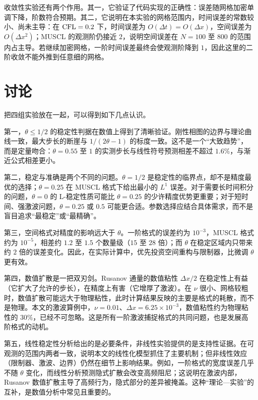 收敛性实验还有两个作用。其一，它验证了代码实现的正确性：误差随网格加密单调下降，阶数符合预期。其二，它说明在本实验的网格范围内，时间误差的常数较小、尚未主导：在 $\mathrm{CFL}=0.2$ 下，时间误差为 $O(\Delta t)=O(\Delta x)$，空间误差为 $O(\Delta x^2)$；MUSCL 的观测阶仍接近 $2$，说明空间误差在 $N=100$ 至 $800$ 的范围内占主导。若继续加密网格，一阶时间误差最终会使观测阶降到 $1$，因此这里的二阶收敛不能外推到任意细的网格。

\section{讨论}
\label{sec:exp-discussion}

把四组实验放在一起，可以得到如下几点认识。

第一，$\theta\le1/2$ 的稳定性判据在数值上得到了清晰验证。刚性相图的边界与理论曲线一致，最大步长的断崖与 $1/(2\theta-1)$ 的标度一致。这不是一个“大致趋势”，而是定量吻合：$\theta=0.55$ 至 $1$ 的实测步长与线性符号预测相差不超过 $1.6\%$，与渐近公式相差更小。

第二，稳定与准确是两个不同的问题。$\theta=1/2$ 是稳定性的临界点，却不是精度最优的选择；$\theta=0.25$ 在 MUSCL 格式下给出最小的 $L^1$ 误差。对于需要长时间积分的问题，$\theta=0$ 的 L-稳定性质可能比 $\theta=0.25$ 的少许精度优势更重要；对于短时间、强激波问题，$\theta=0.25$ 或 $0.5$ 可能更合适。参数选择应结合具体需求，而不是盲目追求“最稳定”或“最精确”。

第三，空间格式对精度的影响远大于 $\theta$。一阶格式的误差约为 $10^{-3}$，MUSCL 格式约为 $10^{-5}$，相差约 $1.2$ 至 $1.5$ 个数量级（$15$ 至 $28$ 倍）；而 $\theta$ 在稳定区域内只带来约 $2$ 倍的误差变化。因此，在实际计算中，优先投资空间重构与限制器，比微调 $\theta$ 更有效。

第四，数值扩散是一把双刃剑。Rusanov 通量的数值粘性 $\Delta x/2$ 在稳定性上有益（它扩大了允许的步长），在精度上有害（它增厚了激波）。在 $\nu$ 很小、网格较粗时，数值扩散可能远大于物理粘性，此时计算结果反映的主要是格式的耗散，而不是物理。本文的激波算例中，$\nu=0.01$、$\Delta x=6.25\times10^{-3}$，数值粘性约为物理粘性的 $30\%$，已经不可忽略。这是所有一阶激波捕捉格式的共同问题，也是发展高阶格式的动机。

第五，线性稳定性分析给出的是必要条件，非线性实验提供的是支持性证据。在可观测的范围内两者一致，说明本文的线性化模型抓住了主要机制；但非线性效应（限制器、激波、边界）仍然在细节上影响结果。例如，一阶格式的宽度误差几乎不随 $\theta$ 变化，而线性分析预测隐式扩散会改变高频阻尼；这说明在激波内部，Rusanov 数值扩散主导了高频行为，隐式部分的差异被掩盖。这种“理论—实验”的互补，是数值分析中常见且重要的。

